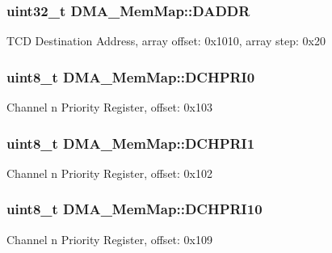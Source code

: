 \subsubsection[{D\+A\+D\+D\+R}]{\setlength{\rightskip}{0pt plus 5cm}uint32\+\_\+t D\+M\+A\+\_\+\+Mem\+Map\+::\+D\+A\+D\+D\+R}\label{struct_d_m_a___mem_map_ae2b0e842221342f28893b3399e17cf82}
T\+C\+D Destination Address, array offset\+: 0x1010, array step\+: 0x20 \hypertarget{struct_d_m_a___mem_map_a9ce85f6eadec6796348eea898eb0dff4}{}
\subsubsection[{D\+C\+H\+P\+R\+I0}]{\setlength{\rightskip}{0pt plus 5cm}uint8\+\_\+t D\+M\+A\+\_\+\+Mem\+Map\+::\+D\+C\+H\+P\+R\+I0}\label{struct_d_m_a___mem_map_a9ce85f6eadec6796348eea898eb0dff4}
Channel n Priority Register, offset\+: 0x103 \hypertarget{struct_d_m_a___mem_map_a48487302ccd8b48c11c7781bbc65ed2a}{}
\subsubsection[{D\+C\+H\+P\+R\+I1}]{\setlength{\rightskip}{0pt plus 5cm}uint8\+\_\+t D\+M\+A\+\_\+\+Mem\+Map\+::\+D\+C\+H\+P\+R\+I1}\label{struct_d_m_a___mem_map_a48487302ccd8b48c11c7781bbc65ed2a}
Channel n Priority Register, offset\+: 0x102 \hypertarget{struct_d_m_a___mem_map_af2d688b08eb6137ca530abf7b28ad8d3}{}
\subsubsection[{D\+C\+H\+P\+R\+I10}]{\setlength{\rightskip}{0pt plus 5cm}uint8\+\_\+t D\+M\+A\+\_\+\+Mem\+Map\+::\+D\+C\+H\+P\+R\+I10}\label{struct_d_m_a___mem_map_af2d688b08eb6137ca530abf7b28ad8d3}
Channel n Priority Register, offset\+: 0x109 \hypertarget{struct_d_m_a___mem_map_ac88e35951301365fcf3ca39e3f75e018}{}
